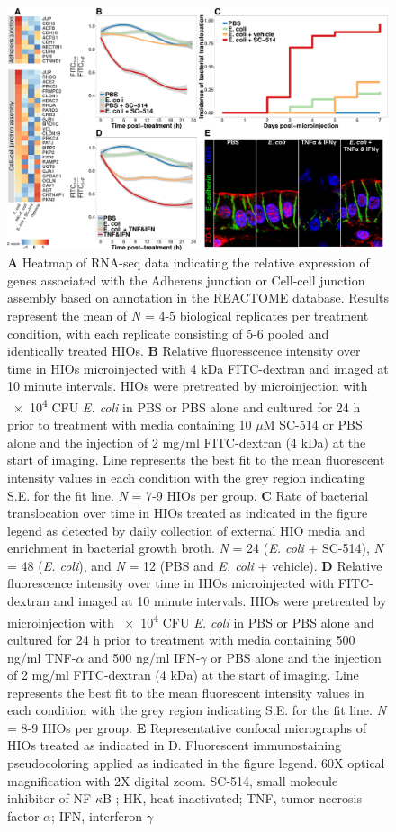 \documentclass[9pt,lineo]{elife}
\begin{document}
\begin{figure}
\begin{fullwidth}
\centering
\includegraphics[width=0.95\linewidth]{./figures/figure8/figure8_multipanel.pdf}
\caption{\textbf{A} Heatmap of RNA-seq data indicating the relative expression of genes associated with the Adherens junction or Cell-cell junction assembly based on annotation in the REACTOME database. Results represent the mean of \textit{N} = 4-5 biological replicates per treatment condition, with each replicate consisting of 5-6 pooled and identically treated HIOs. \textbf{B} Relative fluoresscence intensity over time in HIOs microinjected with 4 kDa FITC-dextran and imaged at 10 minute intervals. HIOs were pretreated by microinjection with \num{e4} CFU \textit{E. coli} in PBS or PBS alone and cultured for 24 h prior to treatment with media containing 10 $\mu$M SC-514 or PBS alone and the injection of 2 mg/ml FITC-dextran (4 kDa) at the start of imaging.  Line represents the best fit to the mean fluorescent intensity values in each condition with the grey region indicating S.E. for the fit line. \textit{N} = 7-9 HIOs per group. \textbf{C} Rate of bacterial translocation over time in HIOs treated as indicated in the figure legend as detected by daily collection of external HIO media and enrichment in bacterial growth broth. \textit{N} = 24 (\textit{E. coli} + SC-514), \textit{N} = 48 (\textit{E. coli}), and \textit{N} = 12 (PBS and \textit{E. coli} + vehicle). \textbf{D} Relative fluorescence intensity over time in HIOs microinjected with FITC-dextran and imaged at 10 minute intervals. HIOs were pretreated by microinjection with \num{e4} CFU \textit{E. coli} in PBS or PBS alone and cultured for 24 h prior to treatment with media containing 500 ng/ml TNF-$\alpha$ and 500 ng/ml IFN-$\gamma$ or PBS alone and the injection of 2 mg/ml FITC-dextran (4 kDa) at the start of imaging. Line represents the best fit to the mean fluorescent intensity values in each condition with the grey region indicating S.E. for the fit line. \textit{N} = 8-9 HIOs per group. \textbf{E} Representative confocal micrographs of HIOs treated as indicated in D. Fluorescent immunostaining pseudocoloring applied as indicated in the figure legend. 60X optical magnification with 2X digital zoom. SC-514, small molecule inhibitor of NF-$\kappa$B ; HK, heat-inactivated; TNF, tumor necrosis factor-$\alpha$; IFN, interferon-$\gamma$}
\label{fig:fullwidth}
\end{fullwidth}
\end{figure}
\end{document}
